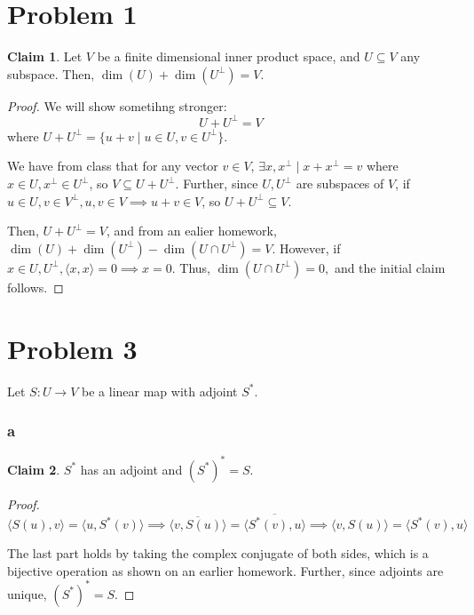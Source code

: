 \documentclass[12pt,letterpaper]{article}
\theoremstyle{definition}
\newtheorem*{claim}{Claim}
\begin{document}
\section*{Problem 1}

\begin{claim}
  Let $V$ be a finite dimensional inner product space, and $U \subseteq V$ any
  subspace. Then, $\dim(U) + \dim(U^\perp) = V$.
\end{claim}

\begin{proof}
  We will show sometihng stronger:
  \[
    U + U^\perp = V
  \]
  where $U + U^\perp = \{u+v \mid u \in U, v \in U^\perp \}$.

  We have from class that for any vector $v \in V$, $\exists x, x^\perp \mid x +
  x^\perp = v$ where $ x \in U, x^\perp \in U^\perp$, so $V \subseteq U + U^\perp$. Further, since $U, U^\perp$
  are subspaces of $V$, if $u \in U, v \in V^\perp, u, v \in V \implies u + v 
  \in V$, so $U + U^\perp \subseteq V$.

  Then, $U + U^\perp = V$, and from an ealier homework, $\dim(U) + \dim(U^\perp)
  - \dim(U \cap U^\perp) = V$. However, if $x \in U, U^\perp, \langle x, x
  \rangle = 0 \implies x = 0$. Thus, $\dim(U \cap U^\perp) = 0,$ and the initial
  claim follows.
\end{proof}

\section*{Problem 3}

Let $S: U \rightarrow V$ be a linear map with adjoint $S^*$.

\subsubsection*{a}

\begin{claim}
  $S^*$ has an adjoint and $(S^*)^* = S$. 
\end{claim}

\begin{proof}
  \[
    \langle S(u), v \rangle = \langle u, S^*(v) \rangle \implies
    \overline{\langle v, S(u) \rangle} = \overline{\langle S^*(v), u \rangle}
    \implies  \langle v, S(u) \rangle = \langle S^*(v), u \rangle
  \]

  The last part holds by taking the complex conjugate of both sides, which is a
  bijective operation as shown on an earlier homework. Further, since adjoints are unique, $(S^*)^* = S$.
\end{proof}
\end{document}

